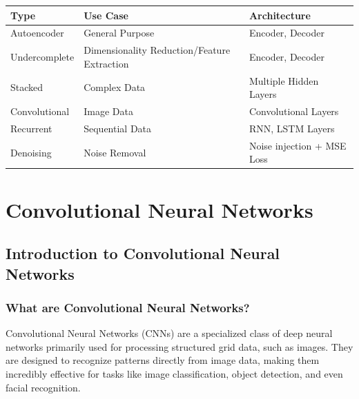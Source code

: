 \documentclass[
  letterpaper,
  DIV=11,
  numbers=noendperiod]{scrreprt}
\begin{document}
\begin{longtable}[]{@{}
  >{\raggedright\arraybackslash}p{}
  >{\raggedright\arraybackslash}p{}
  >{\raggedright\arraybackslash}p{}@{}}
\toprule\noalign{}
\begin{minipage}[b]{\linewidth}\raggedright
Type
\end{minipage} & \begin{minipage}[b]{\linewidth}\raggedright
Use Case
\end{minipage} & \begin{minipage}[b]{\linewidth}\raggedright
Architecture
\end{minipage} \\
\midrule\noalign{}
\endhead
\bottomrule\noalign{}
\endlastfoot
Autoencoder & General Purpose & Encoder, Decoder \\
Undercomplete & Dimensionality Reduction/Feature Extraction & Encoder,
Decoder \\
Stacked & Complex Data & Multiple Hidden Layers \\
Convolutional & Image Data & Convolutional Layers \\
Recurrent & Sequential Data & RNN, LSTM Layers \\
Denoising & Noise Removal & Noise injection + MSE Loss \\
\end{longtable}


\chapter{Convolutional Neural
Networks}\label{convolutional-neural-networks}

\section{Introduction to Convolutional Neural
Networks}\label{introduction-to-convolutional-neural-networks}

\subsection{What are Convolutional Neural
Networks?}\label{what-are-convolutional-neural-networks}

Convolutional Neural Networks (CNNs) are a specialized class of deep
neural networks primarily used for processing structured grid data, such
as images. They are designed to recognize patterns directly from image
data, making them incredibly effective for tasks like image
classification, object detection, and even facial recognition.
\end{document}
